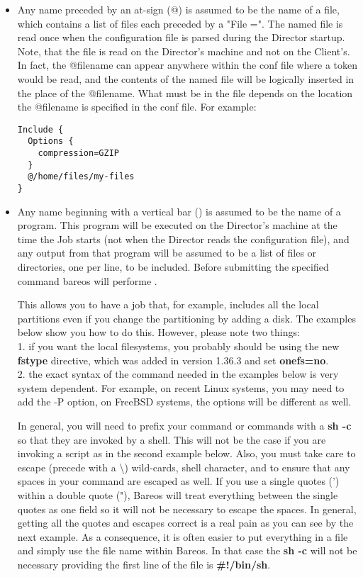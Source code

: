 \begin{itemize}
\item Any name preceded by an at-sign (@) is assumed to be the  name of a
   file, which contains a list of files each preceded by a "File =".  The
   named file is read once when the configuration file is parsed during the
   Director startup.  Note, that the file is read on the Director's machine
   and not on the Client's.  In fact, the @filename can appear anywhere
   within the conf file where a token would be read, and the contents of
   the named file will be logically inserted in the place of the @filename.
   What must be in the file depends on the location the @filename is
   specified in the conf file.  For example:

\footnotesize
\begin{verbatim}
Include {
  Options {
    compression=GZIP
  }
  @/home/files/my-files
}
\end{verbatim}
\normalsize

\item Any name beginning with a vertical bar ({\textbar}) is  assumed to
   be the name of a program.  This program will be executed on the Director's
   machine at the time the Job starts (not when the Director reads the
   configuration file), and any output from that program will be assumed to
   be a list of files or directories, one per line, to be included. Before
   submitting the specified command bareos will performe
   .

   This allows you to have a job that, for example, includes all the local
   partitions even if you change the partitioning by adding a disk.  The
   examples below show you how to do this.  However, please note two
   things: \\
   1.  if you want the local filesystems, you probably should be
   using the new {\bf fstype} directive, which was added in version 1.36.3
   and set {\bf onefs=no}.
   \\

   2.  the exact syntax of the command needed in the examples below is very
   system dependent.  For example, on recent Linux systems, you may need to
   add the -P option, on FreeBSD systems, the options will be different as
   well.

   In general, you will need to prefix your command or commands with a {\bf
   sh -c} so that they are invoked by a shell.  This will not be the case
   if you are invoking a script as in the second example below.  Also, you
   must take care to escape (precede with a \textbackslash{}) wild-cards,
   shell character, and to ensure that any spaces in your command are
   escaped as well.  If you use a single quotes (') within a double quote
   ("), Bareos will treat everything between the single quotes as one field
   so it will not be necessary to escape the spaces.  In general, getting
   all the quotes and escapes correct is a real pain as you can see by the
   next example.  As a consequence, it is often easier to put everything in
   a file and simply use the file name within Bareos.  In that case the
   {\bf sh -c} will not be necessary providing the first line of the file
   is {\bf \#!/bin/sh}.


\end{itemize}
